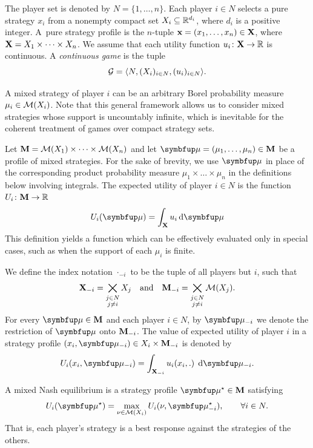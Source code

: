 The player set is denoted by $N=\{1,\dots,n\}$. Each player $i\in N$ selects a pure strategy $x_i$ from a nonempty compact set $X_i\subseteq \mathbb{R}^{d_i}$, where $d_i$ is a positive integer. A~pure strategy profile is the $n$-tuple $\mathbf{x}=(x_1,\dots,x_n)\in \mathbf{X}$, where $\mathbf{X}=X_1\times\dots\times X_n$. We assume that each utility function $u_i\colon \mathbf{X}\to \mathbb{R}$ is continuous. A \emph{continuous game} is the tuple
\begin{equation}\label{def:game}
	\mathcal{G}=\langle N,(X_i)_{i\in N},(u_i)_{i\in N}\rangle.
\end{equation}

A mixed strategy of player $i$ can be an arbitrary Borel probability measure $\mu_i \in \mathcal{M}(X_i)$. Note that this general framework allows us to consider mixed strategies whose support is uncountably infinite, which is inevitable for the coherent treatment of games over compact strategy sets.

Let $\mathbf{M}=\mathcal{M}(X_1)\times \dots \times \mathcal{M}(X_n)$ and let $\bmu=(\mu_1,\dots,\mu_n) \in \bM$ be a profile of mixed strategies. For the sake of brevity, we use $\bmu$ in place of the corresponding product probability measure $\mu_1\times\dots\times \mu_n$ in the definitions below involving integrals. The expected utility of player $i\in N$ is the function $U_i\colon \mathbf{M}\to \mathbb{R}$
\[
    U_i(\bmu) =  \int_{\bX} u_i \dif\bmu
\]
This definition yields a function which can be effectively evaluated only in special cases, such as when the support of each $\mu_i$ is finite.

We define the index notation $\cdot_{-i}$ to be the tuple of all players but $i$, such that
\[
\mathbf{X}_{-i}=\bigtimes_{\substack{j\in N \\ j\neq i}} X_j \quad \text{and} \quad \mathbf{M}_{-i}=\bigtimes_{\substack{j\in N \\ j\neq i}}\mathcal{M}(X_j).
\]
For every $\bmu\in \bM$ and each player $i\in N$, by $\bmu_{-i}$ we denote the restriction of $\bmu$ onto $\mathbf{M}_{-i}$.  The value of expected utility of player $i$ in a strategy profile $(x_i,\bmu_{-i})\in X_i\times \bM_{-i}$ is denoted by
\begin{equation}\label{def:EU}
    U_i(x_i,\bmu_{-i})=\int_{\bX_{-i}} u_i(x_i,.)\; \dif\bmu_{-i}.
\end{equation}

\begin{definition}\label{def:ne}
    A mixed Nash equilibrium is a strategy profile $\bmu^\star\in\bM$ satisfying
    \begin{equation*}
        U_i(\bmu^\star)=\max_{\nu\in \calM(X_i)} U_i(\nu,\bmu_{-i}^\star), \qquad \forall i\in N.
    \end{equation*}
    That is, each player's strategy is a best response against the strategies of the others.
\end{definition}

